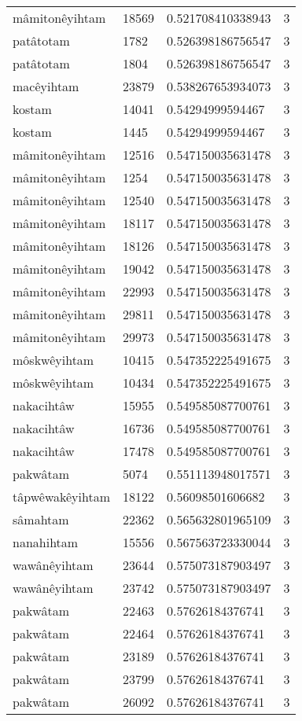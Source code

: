 \begin{longtable}{llll}
mâmitonêyihtam & 18569 & 0.521708410338943 & 3 \\
patâtotam & 1782 & 0.526398186756547 & 3 \\
patâtotam & 1804 & 0.526398186756547 & 3 \\
macêyihtam & 23879 & 0.538267653934073 & 3 \\
kostam & 14041 & 0.54294999594467 & 3 \\
kostam & 1445 & 0.54294999594467 & 3 \\
mâmitonêyihtam & 12516 & 0.547150035631478 & 3 \\
mâmitonêyihtam & 1254 & 0.547150035631478 & 3 \\
mâmitonêyihtam & 12540 & 0.547150035631478 & 3 \\
mâmitonêyihtam & 18117 & 0.547150035631478 & 3 \\
mâmitonêyihtam & 18126 & 0.547150035631478 & 3 \\
mâmitonêyihtam & 19042 & 0.547150035631478 & 3 \\
mâmitonêyihtam & 22993 & 0.547150035631478 & 3 \\
mâmitonêyihtam & 29811 & 0.547150035631478 & 3 \\
mâmitonêyihtam & 29973 & 0.547150035631478 & 3 \\
môskwêyihtam & 10415 & 0.547352225491675 & 3 \\
môskwêyihtam & 10434 & 0.547352225491675 & 3 \\
nakacihtâw & 15955 & 0.549585087700761 & 3 \\
nakacihtâw & 16736 & 0.549585087700761 & 3 \\
nakacihtâw & 17478 & 0.549585087700761 & 3 \\
pakwâtam & 5074 & 0.551113948017571 & 3 \\
tâpwêwakêyihtam & 18122 & 0.56098501606682 & 3 \\
sâmahtam & 22362 & 0.565632801965109 & 3 \\
nanahihtam & 15556 & 0.567563723330044 & 3 \\
wawânêyihtam & 23644 & 0.575073187903497 & 3 \\
wawânêyihtam & 23742 & 0.575073187903497 & 3 \\
pakwâtam & 22463 & 0.57626184376741 & 3 \\
pakwâtam & 22464 & 0.57626184376741 & 3 \\
pakwâtam & 23189 & 0.57626184376741 & 3 \\
pakwâtam & 23799 & 0.57626184376741 & 3 \\
pakwâtam & 26092 & 0.57626184376741 & 3 \\

\end{longtable}
